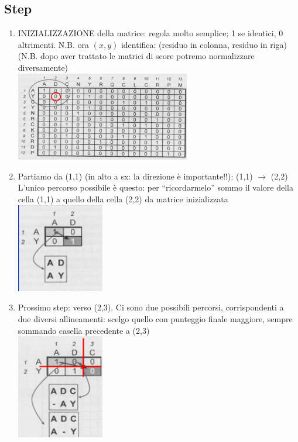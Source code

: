 \documentclass{article}
\begin{document}
\subsection{Step}
\begin{enumerate}
    \item INIZIALIZZAZIONE della matrice: regola molto semplice; 1
    se identici, 0 altrimenti. N.B. ora $(x,y)$ identifica: (residuo in
    colonna, residuo in riga) (N.B. dopo aver trattato le matrici
    di score potremo normalizzare diversamente)\\
    \includegraphics[width=0.6\textwidth]{figures/init.png}
    \item Partiamo da (1,1) (in alto a sx:
    la direzione è importante!!):
    (1,1) $\rightarrow$ (2,2)
    L'unico percorso possibile è
    questo: per “ricordarmelo”
    sommo il valore della cella
    (1,1) a quello della cella (2,2)
    da matrice inizializzata
    \includegraphics[width=0.3\textwidth]{figures/due.png}
    \item Prossimo step: verso (2,3). Ci sono due possibili percorsi, corrispondenti a due diversi
    allineamenti: scelgo quello con punteggio finale maggiore, sempre sommando casella precedente a (2,3)\\
    \includegraphics[width=0.3\textwidth]{figures/tre.png}

\end{enumerate}
\end{document}
